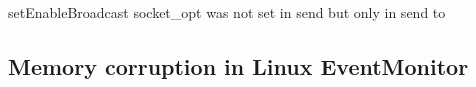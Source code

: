\documentclass[
10pt, %
a4paper, %
oneside, %
headinclude,footinclude, %
BCOR5mm, %
]{scrartcl}
\begin{document}
setEnableBroadcast socket_opt was not set in send but only in send to

\subsection{Memory corruption in Linux EventMonitor}



\renewcommand{\refname}{\spacedlowsmallcaps{References}} %




\end{document}
